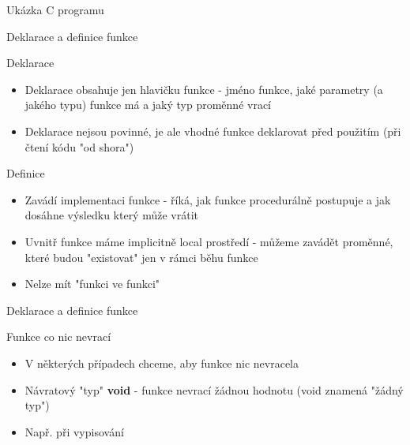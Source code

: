 \documentclass[9pt]{beamer}
\begin{document}
\begin{frame}{Ukázka C programu}
    
\end{frame}

\begin{frame}{Deklarace a definice funkce}
    \begin{block}{Deklarace}
    \begin{itemize}
        \item Deklarace obsahuje jen hlavičku funkce - jméno funkce, jaké parametry (a jakého typu) funkce má a jaký typ proměnné vrací
        \item Deklarace nejsou povinné, je ale vhodné funkce deklarovat před použitím (při čtení kódu "od shora")
    \end{itemize}
    \end{block}
    
    \pause
    \begin{block}{Definice}
        \begin{itemize}
            \item Zavádí implementaci funkce - říká, jak funkce procedurálně postupuje a jak dosáhne výsledku který může vrátit
            \item Uvnitř funkce máme implicitně local prostředí - můžeme zavádět proměnné, které budou "existovat" jen v rámci
            běhu funkce
            \item Nelze mít "funkci ve funkci"
        \end{itemize}
    \end{block}
\end{frame}

\begin{frame}{Deklarace a definice funkce}
    
    \pause
    \begin{block}{Funkce co nic nevrací}
        \begin{itemize}
            \item V některých případech chceme, aby funkce nic nevracela
            \item Návratový "typ" \textbf{void} - funkce nevrací žádnou hodnotu (void znamená "žádný typ")
            \item Např. při vypisování
        \end{itemize}
    \end{block}
    
\end{frame}
\end{document}
